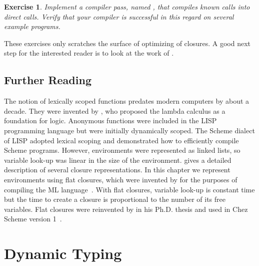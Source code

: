 \documentclass[7x10]{TimesAPriori_MIT}%
\newtheorem{exercise}[theorem]{Exercise}
\numberwithin{theorem}{chapter}
\numberwithin{definition}{chapter}
\numberwithin{equation}{chapter}
\begin{document}
\begin{exercise}\normalfont\normalsize
Implement a compiler pass, named , that
compiles known calls into direct calls. Verify that your compiler is
successful in this regard on several example programs.
\end{exercise}

These exercises only scratches the surface of optimizing of
closures. A good next step for the interested reader is to look at the
work of \citet{Keep:2012ab}.

\section{Further Reading}

The notion of lexically scoped functions predates modern computers by
about a decade. They were invented by \citet{Church:1932aa}, who
proposed the lambda calculus as a foundation for logic. Anonymous
functions were included in the LISP~\citep{McCarthy:1960dz}
programming language but were initially dynamically scoped. The Scheme
dialect of LISP adopted lexical scoping and
\citet{Guy-L.-Steele:1978yq} demonstrated how to efficiently compile
Scheme programs. However, environments were represented as linked
lists, so variable look-up was linear in the size of the
environment. \citet{Appel91} gives a detailed description of several
closure representations. In this chapter we represent environments
using flat closures, which were invented by
\citet{Cardelli:1983aa,Cardelli:1984aa} for the purposes of compiling
the ML language~\citep{Gordon:1978aa,Milner:1990fk}.  With flat
closures, variable look-up is constant time but the time to create a
closure is proportional to the number of its free variables.  Flat
closures were reinvented by \citet{Dybvig:1987ab} in his Ph.D. thesis
and used in Chez Scheme version 1~\citep{Dybvig:2006aa}.


\chapter{Dynamic Typing}
\label{ch:Ldyn}
\setcounter{footnote}{0}
\end{document}
